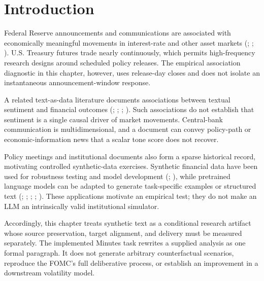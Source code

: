 \section{Introduction}\label{ch2:sec:introduction}


Federal Reserve announcements and communications are associated with
economically meaningful movements in interest-rate and other asset markets
(\cite{vergote2012}; \cite{rosa2013financial};
\cite{jubinski2013fomc}). U.S. Treasury futures trade nearly continuously,
which permits high-frequency research designs around scheduled policy
releases. The empirical association diagnostic in this chapter, however, uses
release-day closes and does not isolate an instantaneous announcement-window
response.

A related text-as-data literature documents associations between textual
sentiment and financial outcomes (\cite{bollen2011twitter};
\cite{ding2015deep}; \cite{ding2016knowledge}; \cite{xu2018stock}). Such
associations do not establish that sentiment is a single causal driver of
market movements. Central-bank communication is multidimensional, and a
document can convey policy-path or economic-information news that a scalar
tone score does not recover.

Policy meetings and institutional documents also form a sparse historical
record, motivating controlled synthetic-data exercises. Synthetic financial
data have been used for robustness testing and model development
(\cite{cao2022synthetic}; \cite{carvajal2022synthetic}), while pretrained
language models can be adapted to generate task-specific examples or
structured text (\cite{schick2021generating}; \cite{peng2023instruction};
\cite{yu2024large}; \cite{li2021synthetic};
\cite{meoni2024generating}). These applications motivate an empirical test;
they do not make an LLM an intrinsically valid institutional simulator.

Accordingly, this chapter treats synthetic text as a conditional research
artifact whose source preservation, target alignment, and delivery must be
measured separately. The implemented Minutes task rewrites a supplied analysis
as one formal paragraph. It does not generate arbitrary counterfactual
scenarios, reproduce the FOMC's full deliberative process, or establish an
improvement in a downstream volatility model.

